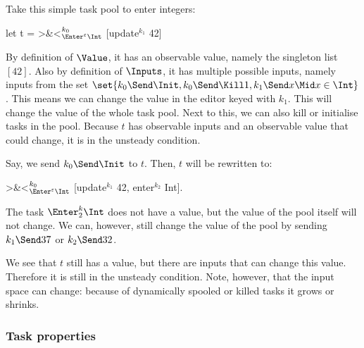 \begin{example}
  \label{exm:integer-task-pool}
  Take this simple task pool to enter integers:
  \begin{TASK}
    let t = >&<$_{\Enter^\epsilon \Int}^{k_0}$ [update$^{k_1}$ 42]
  \end{TASK}

  By definition of $\Value$, it has an observable value, namely the singleton list $[42]$.
  Also by definition of $\Inputs$, it has multiple possible inputs,
  namely inputs from the set $\set{k_0\Send\Init, k_0\Send\Kill1, k_1\Send x \Mid x\in\Int}$.
  This means we can change the value in the editor keyed with $k_1$.
  This will change the value of the whole task pool.
  Next to this, we can also kill or initialise tasks in the pool.
  Because $t$ has observable inputs and an observable value that could change,
  it is in the unsteady condition.

  Say, we send $k_0\Send\Init$ to $t$.
  Then, $t$ will be rewritten to:
  \begin{TASK}
    >&<$_{\Enter^\epsilon \Int}^{k_0}$ [update$^{k_1}$ 42, enter$^{k_2}$ Int].
  \end{TASK}
  The task $\Enter^k_2\Int$ does not have a value,
  but the value of the pool itself will not change.
  We can, however, still change the value of the pool by sending $k_1\Send37$ or $k_2\Send32$.

  We see that $t$ still has a value,
  but there are inputs that can change this value.
  Therefore it is still in the unsteady condition.
  Note, however, that the input space can change:
  because of dynamically spooled or killed tasks it grows or shrinks.
\end{example}


\subsubsection{Task properties}

